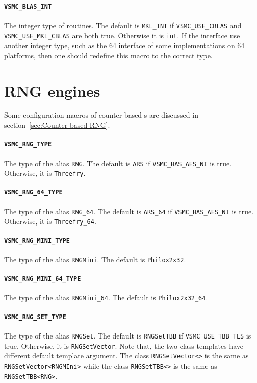 \paragraph{\texttt{VSMC\_BLAS\_INT}} The integer type of \blas routines. The
default is \verb|MKL_INT| if \verb|VSMC_USE_CBLAS| and
\verb|VSMC_USE_MKL_CBLAS| are both true. Otherwise it is \verb|int|. If the
\blas interface use another integer type, such as the \ilp{}64 interface of
some implementations on \lp{}64 platforms, then one should redefine this macro
to the correct type.

\section{RNG engines}
\label{sec:RNG engines}

Some configuration macros of counter-based \rng{}s are discussed in
section~\ref{sec:Counter-based RNG}.

\paragraph{\texttt{VSMC\_RNG\_TYPE}} The type of the alias \verb|RNG|. The
default is \verb|ARS| if \verb|VSMC_HAS_AES_NI| is true. Otherwise, it is
\verb|Threefry|.

\paragraph{\texttt{VSMC\_RNG\_64\_TYPE}} The type of the alias \verb|RNG_64|.
The default is \verb|ARS_64| if \verb|VSMC_HAS_AES_NI| is true. Otherwise, it
is \verb|Threefry_64|.

\paragraph{\texttt{VSMC\_RNG\_MINI\_TYPE}} The type of the alias
\verb|RNGMini|.  The default is \verb|Philox2x32|.

\paragraph{\texttt{VSMC\_RNG\_MINI\_64\_TYPE}} The type of the alias
\verb|RNGMini_64|. The default is \verb|Philox2x32_64|.

\paragraph{\texttt{VSMC\_RNG\_SET\_TYPE}} The type of the alias \verb|RNGSet|.
The default is \verb|RNGSetTBB| if \verb|VSMC_USE_TBB_TLS| is true. Otherwise,
it is \verb|RNGSetVector|. Note that, the two class templates have different
default template argument. The class \verb|RNGSetVector<>| is the same as
\verb|RNGSetVector<RNGMIni>| while the class \verb|RNGSetTBB<>| is the same as
\verb|RNGSetTBB<RNG>|.

